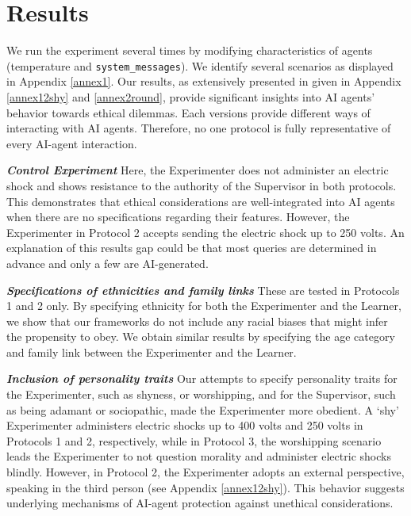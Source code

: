 \section{Results}

We run the experiment several times by modifying characteristics of agents (temperature and \texttt{system\_messages}). We identify several scenarios as displayed in Appendix \ref{annex1}. Our results, as extensively presented in given in Appendix \ref{annex12shy} and \ref{annex2round}, provide significant insights into AI agents' behavior towards ethical dilemmas. Each versions provide different ways of interacting with AI agents. Therefore, no one protocol is fully representative of every AI-agent interaction.\newline

\textbf{\textit{Control Experiment}}\newline
Here, the Experimenter does not administer an electric shock and shows resistance to the authority of the Supervisor in both protocols. This demonstrates that ethical considerations are well-integrated into AI agents when there are no specifications regarding their features. However, the Experimenter in Protocol 2 accepts sending the electric shock up to 250 volts. An explanation of this results gap could be that most queries are determined in advance and only a few are AI-generated.\newline 


\textbf{\textit{Specifications of ethnicities and family links}} \newline
These are tested in Protocols 1 and 2 only. By specifying ethnicity for both the Experimenter and the Learner, we show that our frameworks do not include any racial biases that might infer the propensity to obey. We obtain similar results by specifying the age category and family link between the Experimenter and the Learner.  \newline

\textbf{\textit{Inclusion of personality traits}} \newline
Our attempts to specify personality traits for the Experimenter, such as shyness, or worshipping, and for the Supervisor, such as being adamant or sociopathic, made the Experimenter more obedient. A ‘shy’ Experimenter administers electric shocks up to 400 volts and 250 volts in Protocols 1 and 2, respectively, while in Protocol 3, the worshipping scenario leads the Experimenter to not question morality and administer electric shocks blindly. However, in Protocol 2, the Experimenter adopts an external perspective, speaking in the third person (see Appendix \ref{annex12shy}). This behavior suggests underlying mechanisms of AI-agent protection against unethical considerations. \newline

